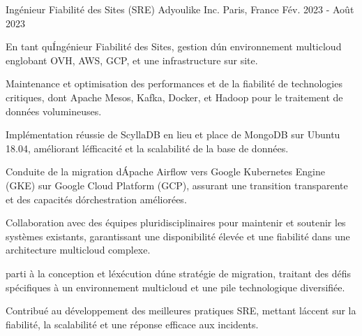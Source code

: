 \begin{cventries}
  \cventry
    {Ingénieur Fiabilité des Sites (SRE)} %
    {Adyoulike Inc.} %
    {Paris, France} %
    {Fév. 2023 - Août 2023} %
    {
      \begin{cvitems} %
        \item {En tant qu\' Ingénieur Fiabilité des Sites, gestion d\' un environnement multicloud englobant OVH, AWS, GCP, et une infrastructure sur site.}
        \item {Maintenance et optimisation des performances et de la fiabilité de technologies critiques, dont Apache Mesos, Kafka, Docker, et Hadoop pour le traitement de données volumineuses.}
        \item {Implémentation réussie de ScyllaDB en lieu et place de  MongoDB sur Ubuntu 18.04, améliorant l\' efficacité et la scalabilité de la base de données.}
        \item {Conduite de la migration d\' Apache Airflow vers Google Kubernetes Engine (GKE) sur Google Cloud Platform (GCP), assurant une transition transparente et des capacités d\' orchestration améliorées.}
        \item {Collaboration avec des équipes pluridisciplinaires pour maintenir et soutenir les systèmes existants, garantissant une disponibilité élevée et une fiabilité dans une architecture multicloud complexe.}
        \item {parti à la  conception et l\' exécution d\' une stratégie de migration, traitant des défis spécifiques à un environnement multicloud et une pile technologique diversifiée.}
        \item {Contribué au développement des meilleures pratiques SRE, mettant l\' accent sur la fiabilité, la scalabilité et une réponse efficace aux incidents.}
      \end{cvitems}
      
    }


\end{cventries}
